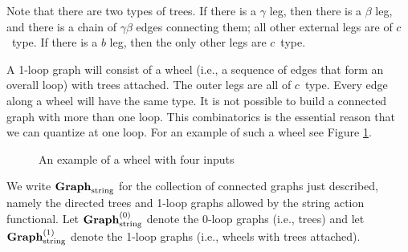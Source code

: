 Note that there are two types of trees.
If there is a $\gamma$ leg, then there is a $\beta$ leg,
and there is a chain of $\gamma\beta$ edges connecting them;
all other external legs are of $c$~type.
If there is a $b$ leg, then the only other legs are $c$~type.

A 1-loop graph will consist of a wheel (i.e., a sequence of edges that form an overall loop)
with trees attached.
The outer legs are all of $c$~type.
Every edge along a wheel will have the same type.
It is not possible to build a connected graph with more than one loop.
This combinatorics is the essential reason that we can quantize at one loop.
For an example of such a wheel see Figure \ref{fig:wheel}.

\begin{figure}
\caption{An example of a wheel with four inputs}
\label{fig:wheel}
\end{figure}

We write ${\bf Graph}_{\rm string}$ for the collection of connected graphs just described,
namely the directed trees and 1-loop graphs allowed by the string action functional.
Let ${\bf Graph}_{\rm string}^{(0)}$ denote the 0-loop graphs (i.e., trees) and let ${\bf Graph}_{\rm string}^{(1)}$ denote the 1-loop graphs (i.e., wheels with trees attached).



